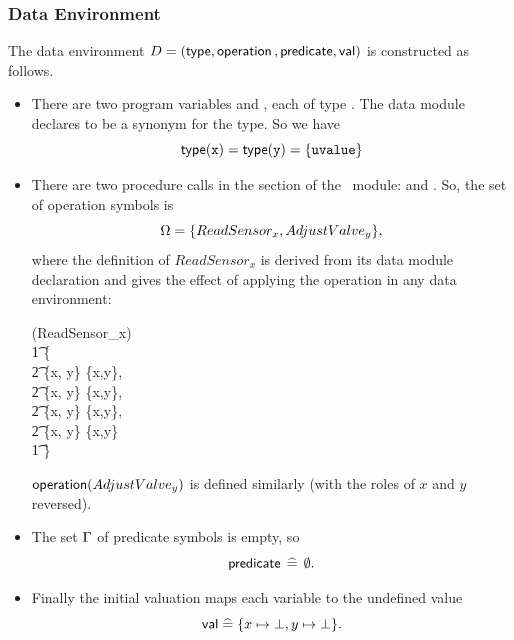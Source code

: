 \subsubsection{Data Environment}
The data environment ${D} = (\mathop{\sf type},\mathop{\sf operation}{},\mathop{\sf predicate},{\mathop{\sf val}})$ is
constructed as follows.
\begin{itemize}
\item There are two program variables  and , each of type 
  . The data module declares  
  to be a synonym for the  type. So we have
    \[\mathop{\sf type}(\mbox{\tt x}) = \mathop{\sf type}(\mbox{\tt y}) = \{\mbox{\tt uvalue}\}\]
\item There are two procedure calls in the 
  section of the \candle\ module:  and .
  So, the set of operation symbols is 
   \[\Omega = \{ReadSensor_x,AdjustValve_y\},\] where the definition of
  $ReadSensor_x$ is derived from its data module declaration and gives the
  effect of applying the operation in any data environment:
\begin{zed}  
 \interpop(ReadSensor_x)\;  \\
\t1 \{\\
\t2 \{x\mapsto\undefined, y\mapsto\undefined\} \mapsto \{x\mapsto{},y\mapsto\undefined\}, \\
\t2 \{x\mapsto\undefined, y\mapsto{}\} \mapsto \{x\mapsto{},y\mapsto{}\}, \\
\t2 \{x\mapsto{}, y\mapsto\undefined\} \mapsto \{x\mapsto{},y\mapsto\undefined\}, \\
\t2 \{x\mapsto{}, y\mapsto{}\} \mapsto \{x\mapsto{},y\mapsto{}\} \\
\t1 \}
\end{zed} 
$\mathop{\sf operation}(AdjustValve_y)$ is defined similarly (with the roles of
$x$ and $y$ reversed).
\item The set $\Gamma$ of predicate symbols is empty, so
  \[\mathop{\sf predicate}\, \mathrel{\widehat=}\, \emptyset.\]
\item Finally the initial valuation maps each variable to the
  undefined value
   \[{\mathop{\sf val}} \mathrel{\widehat=} \{x\mapsto\bot,y\mapsto\bot\}.\]
\end{itemize}  

